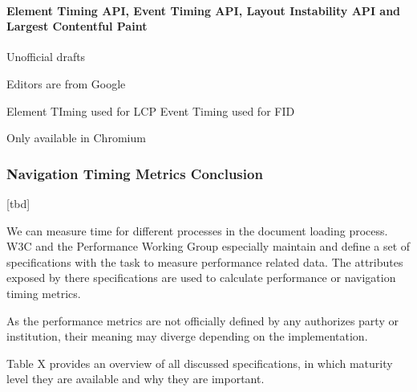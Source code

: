 


\paragraph{Element Timing API, Event Timing API, Layout Instability API and Largest Contentful Paint}

Unofficial drafts






Editors are from Google



Element TIming used for LCP
Event Timing used for FID


Only available in Chromium






\subsubsection{Navigation Timing Metrics Conclusion}

[tbd]

We can measure time for different processes in the document loading process.
W3C and the Performance Working Group especially maintain and define a set of specifications with the task to measure performance related data.
The attributes exposed by there specifications are used to calculate performance or navigation timing metrics.

As the performance metrics are not officially defined by any authorizes party or institution, their meaning may diverge depending on the implementation.

Table X provides an overview of all discussed specifications, in which maturity level they are available and why they are important.



